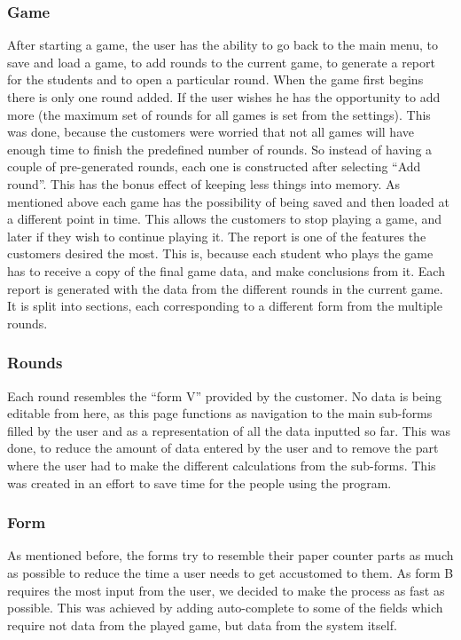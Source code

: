 \documentclass{l3proj}
\begin{document}
\subsubsection{Game}
After starting a game, the user has the ability to go back to the main menu, to save and load a game, to add rounds to the current game, to generate a report for the students and to open a particular round. 
When the game first begins there is only one round added. If the user wishes he has the opportunity to add more (the maximum set of rounds for all games is set from the settings). This was done, because the customers were worried that not all games will have enough time to finish the predefined number of rounds. So instead of having a couple of pre-generated rounds, each one is constructed after selecting “Add round”. This has the bonus effect of keeping less things into memory.
As mentioned above each game has the possibility of being saved and then loaded at a different point in time. This allows the customers to stop playing a game, and later if they wish to continue playing it.
The report is one of the features the customers desired the most. This is, because each student who plays the game has to receive a copy of the final game data, and make conclusions from it. Each report is generated with the data from the different rounds in the current game. It is split into sections, each corresponding to a different form from the multiple rounds.


\subsubsection{Rounds}
Each round resembles the “form V” provided by the customer. No data is being editable from here, as this page functions as navigation to the main sub-forms filled by the user and as a representation of all the data inputted so far. This was done, to reduce the amount of data entered by the user and to remove the part where the user had to make the different calculations from the sub-forms. This was created in an effort to save time for the people using the program.

\subsubsection{Form}
As mentioned before, the forms try to resemble their paper counter parts as much as possible to reduce the time a user needs to get accustomed to them. As form B requires the most input from the user, we decided to make the process as fast as possible. This was achieved by adding auto-complete to some of the fields which require not data from the played game, but data from the system itself.
\end{document}
